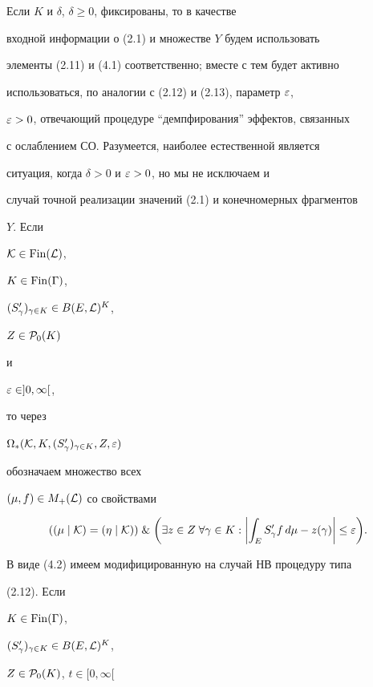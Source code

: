 Если $K$ и $\delta$, $\delta \ge 0$, фиксированы, то в качестве


входной информации о (2.1) и множестве $Y$ будем использовать


элементы (2.11) и (4.1) соответственно; вместе с тем будет активно


использоваться, по аналогии с (2.12) и (2.13), параметр $\varepsilon$,


$\varepsilon > 0$, отвечающий процедуре ``демпфирования'' эффектов, связанных


с ослаблением СО. Разумеется, наиболее естественной является


ситуация, когда $\delta > 0$ и $\varepsilon > 0$, но мы не исключаем и


случай точной реализации значений (2.1) и конечномерных фрагментов


$Y$. Если


${\cal K} \in \operatorname{Fin}({\cal L})$,


$K \in \operatorname{Fin}(\Gamma)$,


$(S'_\gamma)_{\gamma \in K} \in B(E, {\cal L})^K$,


$Z \in {\cal P}_0(K)$ 


и


$\varepsilon \in ]0, \infty[$,


то через


$\Omega_*({\cal K}, K, (S'_\gamma)_{\gamma \in K}, Z, \varepsilon)$


обозначаем множество всех


$(\mu, f) \in M_+({\cal L})$ со свойствами


%


\begin{equation}


((\mu \mid {\cal K}) = (\eta \mid {\cal K})) \; \& \;


\biggl(\exists z \in Z


\; \forall \gamma \in K: \biggl| \int_E S'_\gamma f\,d\mu -


z(\gamma)\biggr| \le \var\biggr).


\end{equation}


%


В виде (4.2) имеем модифицированную на случай НВ процедуру типа


(2.12). Если 


$K \in \operatorname{Fin}(\Gamma)$,


$(S'_\gamma)_{\gamma \in K} \in B(E, {\cal L})^K$,


$Z \in {\cal P}_0(K)$, $t \in [0,\infty[$ 


